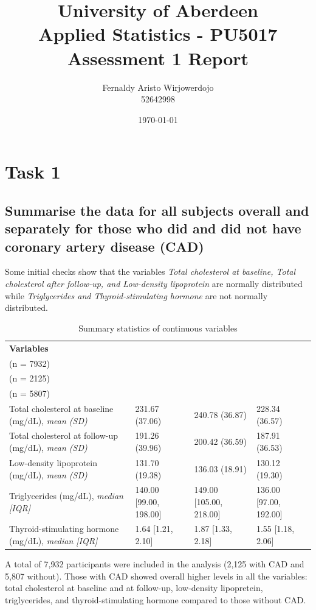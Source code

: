 \documentclass{article}
\title{University of Aberdeen\\Applied Statistics - PU5017\\Assessment 1 Report}
\author{Fernaldy Aristo Wirjowerdojo\\52642998}
\date{\today}
\begin{document}
\maketitle

\section*{Task 1}
\subsection*{Summarise the data for all subjects overall and separately for those who did and did not have coronary artery disease (CAD)}
Some initial checks show that the variables \textit{Total cholesterol at baseline, Total cholesterol after follow-up, and Low-density lipoprotein} are normally distributed while \textit{Triglycerides and Thyroid-stimulating hormone} are not normally distributed.
\begin{table}[H]
\small
\renewcommand{\arraystretch}{1.2}
\begin{tabularx}{\textwidth}{ X X X X } \hline
\textbf{Variables} & 
\textbf{\begin{tabular}[l]{@{}l@{}}Overall\\ (n = 7932)\end{tabular}} & 
\textbf{\begin{tabular}[l]{@{}l@{}}CAD\\ (n = 2125)\end{tabular}} & 
\textbf{\begin{tabular}[l]{@{}l@{}}No CAD\\ (n = 5807)\end{tabular}} \\ \hline
Total cholesterol at baseline (mg/dL), \textit{mean (SD)} & 231.67 (37.06) & 240.78 (36.87) & 228.34 (36.57) \\ \hline
Total cholesterol at follow-up (mg/dL), \textit{mean (SD)} & 191.26 (39.96) & 200.42 (36.59) & 187.91 (36.53) \\ \hline
Low-density lipoprotein (mg/dL), \textit{mean (SD)} & 131.70 (19.38) & 136.03 (18.91) & 130.12 (19.30) \\ \hline
Triglycerides (mg/dL), \textit{median [IQR]} & 140.00 [99.00, 198.00] & 149.00 [105.00, 218.00] & 136.00 [97.00, 192.00] \\ \hline
Thyroid-stimulating hormone (mg/dL), \textit{median [IQR]} & 1.64 [1.21, 2.10] & 1.87 [1.33, 2.18] & 1.55 [1.18, 2.06] \\ \hline
\end{tabularx}
\caption{Summary statistics of continuous variables}
\label{tab:summary-stats}
\end{table}
A total of 7,932 participants were included in the analysis (2,125 with CAD and 5,807 without). Those with CAD showed overall higher levels in all the variables: total cholesterol at baseline and at follow-up, low-density lipopretein, triglycerides, and thyroid-stimulating hormone compared to those without CAD.
\end{document}
